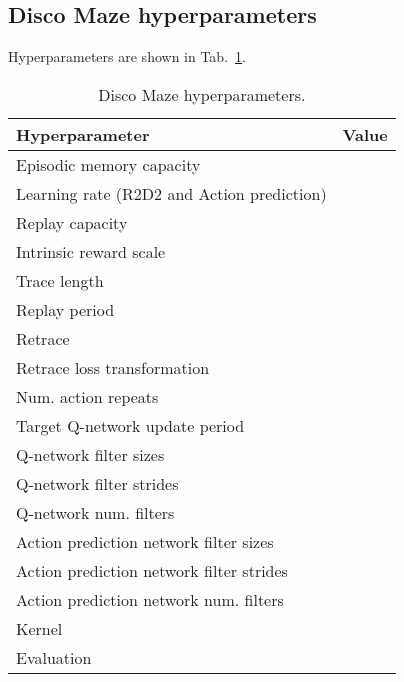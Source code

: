 \documentclass{article} \usepackage{iclr2020_conference,times}
\begin{document}
\subsection{Disco Maze hyperparameters}
Hyperparameters are shown in Tab.~\ref{table_hyper_discomaze}.
\begin{table}[h!]
\centering
\begin{tabular}{l|c}
\textbf{Hyperparameter} & \textbf{Value} \\ \hline
Episodic memory capacity &  \\ \hline
Learning rate (R2D2 and Action prediction) &   \\ \hline
Replay capacity &  \\ \hline 
Intrinsic reward scale  &  \\ \hline 
Trace length &  \\ \hline
Replay period &  \\ \hline
Retrace  &  \\ \hline
Retrace loss transformation &  \\ \hline
Num. action repeats &  \\ \hline
Target Q-network update period &  \\ \hline
Q-network filter sizes &  \\ \hline
Q-network filter strides &  \\ \hline
Q-network num. filters &  \\ \hline
Action prediction network filter sizes &  \\ \hline
Action prediction network filter strides &  \\ \hline
Action prediction network num. filters &  \\ \hline
Kernel  &  \\ \hline
Evaluation  &  \\ \hline

\end{tabular}
\caption{Disco Maze hyperparameters.}
\label{table_hyper_discomaze}
\vspace{-2ex}
\end{table}
\end{document}
